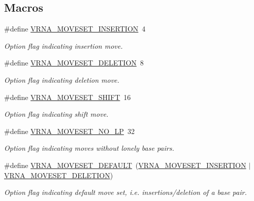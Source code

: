 \subsection*{Macros}
\begin{DoxyCompactItemize}
\item 
\#define \mbox{\hyperlink{group__neighbors_gaf39028db9c70d3be528929182a3f2d5a}{V\+R\+N\+A\+\_\+\+M\+O\+V\+E\+S\+E\+T\+\_\+\+I\+N\+S\+E\+R\+T\+I\+ON}}~4
\begin{DoxyCompactList}\small\item\em Option flag indicating insertion move. \end{DoxyCompactList}\item 
\#define \mbox{\hyperlink{group__neighbors_gac05db9392c6647e3e9a6982096c5b384}{V\+R\+N\+A\+\_\+\+M\+O\+V\+E\+S\+E\+T\+\_\+\+D\+E\+L\+E\+T\+I\+ON}}~8
\begin{DoxyCompactList}\small\item\em Option flag indicating deletion move. \end{DoxyCompactList}\item 
\#define \mbox{\hyperlink{group__neighbors_ga68ea27c81de4b74e48b775c04052590b}{V\+R\+N\+A\+\_\+\+M\+O\+V\+E\+S\+E\+T\+\_\+\+S\+H\+I\+FT}}~16
\begin{DoxyCompactList}\small\item\em Option flag indicating shift move. \end{DoxyCompactList}\item 
\#define \mbox{\hyperlink{group__neighbors_ga258084b251b218fba9398826435a4393}{V\+R\+N\+A\+\_\+\+M\+O\+V\+E\+S\+E\+T\+\_\+\+N\+O\+\_\+\+LP}}~32
\begin{DoxyCompactList}\small\item\em Option flag indicating moves without lonely base pairs. \end{DoxyCompactList}\item 
\#define \mbox{\hyperlink{group__neighbors_gaa5ffec4dd0d02df320f123e6888154d1}{V\+R\+N\+A\+\_\+\+M\+O\+V\+E\+S\+E\+T\+\_\+\+D\+E\+F\+A\+U\+LT}}~(\mbox{\hyperlink{group__neighbors_gaf39028db9c70d3be528929182a3f2d5a}{V\+R\+N\+A\+\_\+\+M\+O\+V\+E\+S\+E\+T\+\_\+\+I\+N\+S\+E\+R\+T\+I\+ON}} $\vert$ \mbox{\hyperlink{group__neighbors_gac05db9392c6647e3e9a6982096c5b384}{V\+R\+N\+A\+\_\+\+M\+O\+V\+E\+S\+E\+T\+\_\+\+D\+E\+L\+E\+T\+I\+ON}})
\begin{DoxyCompactList}\small\item\em Option flag indicating default move set, i.\+e. insertions/deletion of a base pair. \end{DoxyCompactList}\end{DoxyCompactItemize}
